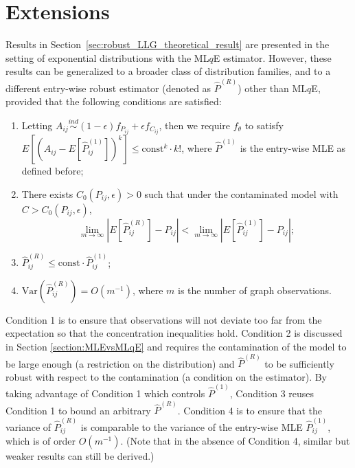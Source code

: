 \section{Extensions}
\label{sec:robust_LLG_extension}

Results in Section~\ref{sec:robust_LLG_theoretical_result} are presented in the setting of exponential distributions with the ML$q$E estimator. However, these results can be generalized to a broader class of distribution families, and to a different entry-wise robust estimator (denoted as $\hat{P}^{(R)}$) other than ML$q$E, provided that the following conditions are satisfied:
\begin{enumerate}
\item Letting $A_{ij} \stackrel{ind}{\sim} (1-\epsilon) f_{P_{ij}} + \epsilon f_{C_{ij}}$, then we require $f_\theta$ to satisfy $E[(A_{ij} - E[\hat{P}_{ij}^{(1)}])^k] \le \mathrm{const}^k \cdot k!$, where $\hat{P}^{(1)}$ is the entry-wise MLE as defined before;
\item There exists $C_0(P_{ij}, \epsilon) > 0$ such that under the contaminated model with $C > C_0(P_{ij}, \epsilon)$,
\[
	\lim_{m \to \infty} \left| E[\hat{P}^{(R)}_{ij}] - P_{ij} \right| < 
    \lim_{m \to \infty} \left| E[\hat{P}^{(1)}_{ij}] - P_{ij} \right|;
\]
\item $\hat{P}^{(R)}_{ij} \le \mathrm{const} \cdot \hat{P}_{ij}^{(1)}$;
\item $\mathrm{Var}(\hat{P}^{(R)}_{ij}) = O(m^{-1})$, where $m$ is the number of graph observations.
\end{enumerate}


Condition 1 is to ensure that observations will not deviate too far from the expectation so that the concentration inequalities hold.
Condition 2 is discussed in Section \ref{section:MLEvsMLqE} and requires the contamination of the model to be large enough (a restriction on the distribution) and $\hat{P}^{(R)}$ to be sufficiently robust with respect to the contamination (a condition on the estimator).
By taking advantage of Condition 1 which controls $\hat{P}^{(1)}$, Condition 3 reuses Condition 1 to bound an arbitrary $\hat{P}^{(R)}$.
Condition 4 is to ensure that the variance of $\hat{P}^{(R)}_{ij}$ is comparable to the variance of the entry-wise MLE $\hat{P}^{(1)}_{ij}$, which is of order $O(m^{-1})$. (Note that in the absence of Condition 4, similar but weaker results can still be derived.)


